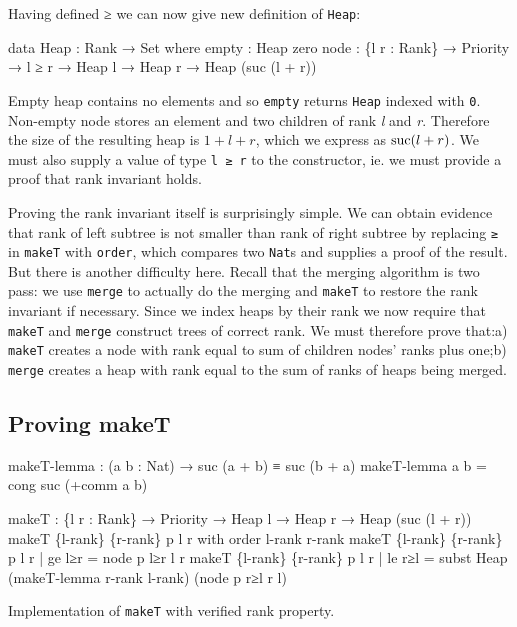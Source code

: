 Having defined ≥ we can now give new definition of \texttt{Heap}:

\begin{code}
data Heap : Rank → Set where
  empty : Heap zero
  node  : \{l r : Rank\} → Priority → l ≥ r →
          Heap l → Heap r → Heap (suc (l + r))
\end{code}

\noindent
Empty heap contains no elements and so \texttt{empty} returns \texttt{Heap} indexed with \texttt{0}. Non-empty node stores an element and two children of rank \textit{l} and \textit{r}. Therefore the size of the resulting heap is $1 + l + r$, which we express as $\operatorname{suc}(l + r)$. We must also supply a value of type \texttt{l ≥ r} to the constructor, ie. we must provide a proof that rank invariant holds.

Proving the rank invariant itself is surprisingly simple. We can obtain evidence that rank of left subtree is not smaller than rank of right subtree by replacing \texttt{≥} in \texttt{makeT} with \texttt{order}, which compares two \texttt{Nat}s and supplies a proof of the result. But there is another difficulty here. Recall that the merging algorithm is two pass: we use \texttt{merge} to actually do the merging and \texttt{makeT} to restore the rank invariant if necessary. Since we index heaps by their rank we now require that \texttt{makeT} and \texttt{merge} construct trees of correct rank. We must therefore prove that:\linebreak a) \texttt{makeT} creates a node with rank equal to sum of children nodes' ranks plus one;\linebreak b) \texttt{merge} creates a heap with rank equal to the sum of ranks of heaps being merged.

\subsection{Proving makeT}\label{sec:twopass-makeT-proof}

\begin{listing}[b!]
\begin{code}
makeT-lemma : (a b : Nat) → suc (a + b) ≡ suc (b + a)
makeT-lemma a b = cong suc (+comm a b)

makeT : \{l r : Rank\} → Priority → Heap l → Heap r → Heap (suc (l + r))
makeT \{l-rank\} \{r-rank\} p l r with order l-rank r-rank
makeT \{l-rank\} \{r-rank\} p l r | ge l≥r
  = node p l≥r l r
makeT \{l-rank\} \{r-rank\} p l r | le r≥l
  = subst Heap (makeT-lemma r-rank l-rank) (node p r≥l r l)
\end{code}
\caption{Implementation of \texttt{makeT} with verified rank property.}\label{lst:rank-proof-makeT-two-pass}
\end{listing}

